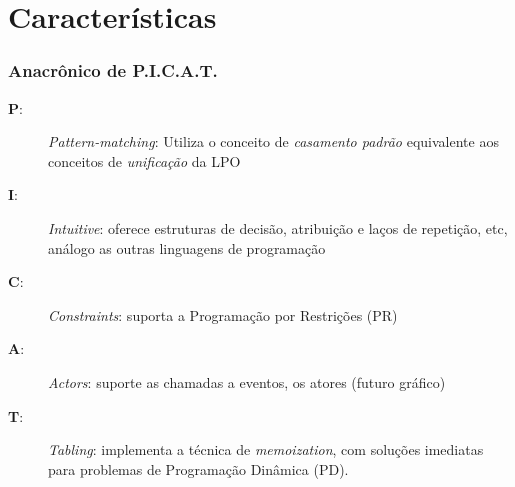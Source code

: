 \documentclass[10pt]{beamer}
\begin{document}
\section{Características}
\begin{frame}
    \frametitle{Anacrônico de \textbf{P.I.C.A.T.}}
  
 \begin{description}
   
 
 \item [\textbf{P}:] \textit{Pattern-matching}:  Utiliza o conceito de \textit{casamento padrão}
 equivalente aos conceitos de \textit{unificação} da LPO
 
 \item [\textbf{I}:] \textit{Intuitive}: oferece estruturas de decisão, atribuição e 
 laços de repetição, etc, análogo as outras linguagens de programação
 
  \item [\textbf{C}:] \textit{Constraints}: suporta a Programação por Restrições (PR)
 
     \item [\textbf{A}:] \textit{Actors}: suporte as chamadas a eventos, os atores (futuro gráfico) 
 
  \item [\textbf{T}:] \textit{Tabling}: implementa a técnica de \textit{memoization}, com soluções imediatas para problemas de Programação Dinâmica (PD).
   
  
\end{description}
\end{frame}


\end{document}
